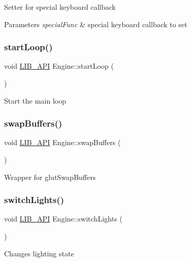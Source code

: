 Setter for special keyboard callback 
\begin{DoxyParams}{Parameters}
{\em special\+Func} & special keyboard callback to set \\
\hline
\end{DoxyParams}
\mbox{\label{classEngine_af0255a9a3e166e47a13ecbba393956de}} 
\subsubsection{\texorpdfstring{start\+Loop()}{startLoop()}}
{\footnotesize\ttfamily void \hyperlink{Engine_8h_a77278c8cc96e39fb27b5d0a347c8fb3d}{L\+I\+B\+\_\+\+A\+PI} Engine\+::start\+Loop (\begin{DoxyParamCaption}{ }\end{DoxyParamCaption})}

Start the main loop \mbox{\label{classEngine_a0544e301002dd8af6958796fee18430e}} 
\subsubsection{\texorpdfstring{swap\+Buffers()}{swapBuffers()}}
{\footnotesize\ttfamily void \hyperlink{Engine_8h_a77278c8cc96e39fb27b5d0a347c8fb3d}{L\+I\+B\+\_\+\+A\+PI} Engine\+::swap\+Buffers (\begin{DoxyParamCaption}{ }\end{DoxyParamCaption})}

Wrapper for glut\+Swap\+Buffers \mbox{\label{classEngine_a4c2cc9c594912622eb4c21ccb73a3a6d}} 
\subsubsection{\texorpdfstring{switch\+Lights()}{switchLights()}}
{\footnotesize\ttfamily void \hyperlink{Engine_8h_a77278c8cc96e39fb27b5d0a347c8fb3d}{L\+I\+B\+\_\+\+A\+PI} Engine\+::switch\+Lights (\begin{DoxyParamCaption}{ }\end{DoxyParamCaption})}

Changes lighting state \mbox{\label{classEngine_a3f92d7e6ea9beeac958fcc243ee7d434}} 
